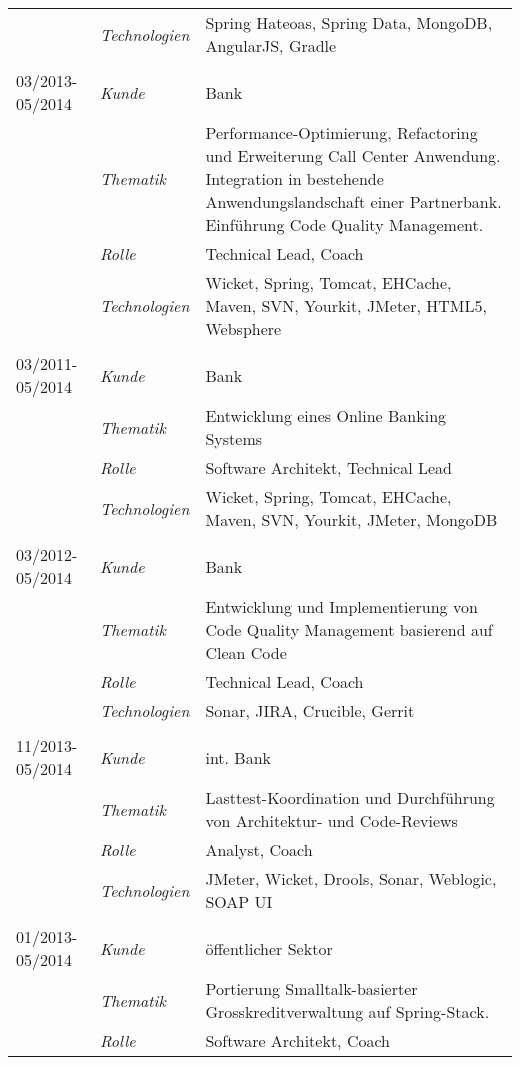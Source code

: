 \begin{longtable}{@{}>{}p{4cm}>{\itshape}p{2cm}>{}p{9cm}}
\nopagebreak		& Technologien	& Spring Hateoas, Spring Data, MongoDB, AngularJS, Gradle\\
\\
03/2013-05/2014     & Kunde 	    & Bank\\
\nopagebreak		& Thematik	    & Performance-Optimierung, Refactoring und Erweiterung Call Center Anwendung. Integration in bestehende Anwendungslandschaft einer Partnerbank. Einführung Code Quality Management.\\
\nopagebreak		& Rolle 	    & Technical Lead, Coach\\
\nopagebreak		& Technologien	& Wicket, Spring, Tomcat, EHCache, Maven, SVN, Yourkit, JMeter, HTML5, Websphere\\
\\
03/2011-05/2014     & Kunde 	    & Bank\\
\nopagebreak		& Thematik	    & Entwicklung eines Online Banking Systems\\
\nopagebreak		& Rolle 	    & Software Architekt, Technical Lead\\
\nopagebreak		& Technologien	& Wicket, Spring, Tomcat, EHCache, Maven, SVN, Yourkit, JMeter, MongoDB\\
\\
03/2012-05/2014     & Kunde         & Bank\\
\nopagebreak        & Thematik      & Entwicklung und Implementierung von Code Quality Management basierend auf Clean Code\\
\nopagebreak        & Rolle         & Technical Lead, Coach\\
\nopagebreak        & Technologien  & Sonar, JIRA, Crucible, Gerrit\\
\\
11/2013-05/2014     & Kunde         & int. Bank\\
\nopagebreak        & Thematik      & Lasttest-Koordination und Durchführung von Architektur- und Code-Reviews\\
\nopagebreak        & Rolle         & Analyst, Coach\\
\nopagebreak        & Technologien  & JMeter, Wicket, Drools, Sonar, Weblogic, SOAP UI\\
\\
01/2013-05/2014     & Kunde         & öffentlicher Sektor\\
\nopagebreak        & Thematik      & Portierung Smalltalk-basierter Grosskreditverwaltung auf Spring-Stack. \\
\nopagebreak        & Rolle         & Software Architekt, Coach\\

\end{longtable}
